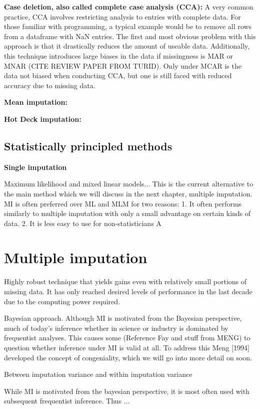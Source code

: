 \documentclass{article}
\begin{document}
	\textbf{Case deletion, also called complete case analysis (CCA):}
	A very common practice, CCA involves restricting analysis to entries with complete data. For those familiar with programming, a typical example would be to remove all rows from a dataframe with NaN entries. The first and most obvious problem with this approach is that it drastically reduces the amount of useable data. Additionally, this technique introduces large biases in the data if missingness is MAR or MNAR (CITE REVIEW PAPER FROM TURID). Only under MCAR is the data not biased when conducting CCA, but one is still faced with reduced accuracy due to missing data. 
	
	
	\textbf{Mean imputation:}
	
	\textbf{Hot Deck imputation:}
	
	\subsection{Statistically principled methods}
	
	
	\textbf{Single imputation}
	
	
	Maximum likelihood and mixed linear models... This is the current alternative to the main method which we will discuss in the next chapter, multiple imputation. MI is often preferred over ML and MLM for two reasons: 
	1. It often performs similarly to multiple imputation with only a small advantage on certain kinds of data.
	2. It is less easy to use for non-statisticians
	A
	
	\section{Multiple imputation}
	
	Highly robust technique that yields gains even with relatively small portions of missing data. It has only reached desired levels of performance in the last decade due to the computing power required. 
	
	Bayesian approach. Although MI is motivated from the Bayesian perspective, much of today's inference whether in science or industry is dominated by frequentist analyses. This causes some (Reference Fay and stuff from MENG) to question whether inference under MI is valid at all. To address this Meng [1994] developed the concept of congeniality, which we will go into more detail on soon.
	
	Between imputation variance and within imputation variance
	
	
	While MI is motivated from the bayesian perspective, it is most often used with subsequent frequentist inference. Thus ...
	
\end{document}
